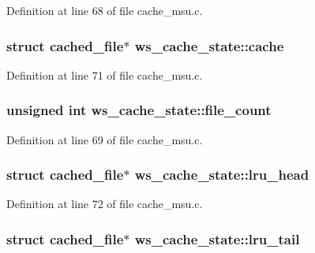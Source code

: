 Definition at line 68 of file cache\-\_\-msu.\-c.

\hypertarget{structws__cache__state_a3094652811095146a2dd8ccc48f62808}{
\subsubsection[{cache}]{\setlength{\rightskip}{0pt plus 5cm}struct {\bf cached\-\_\-file}$\ast$ ws\-\_\-cache\-\_\-state\-::cache}}\label{structws__cache__state_a3094652811095146a2dd8ccc48f62808}


Definition at line 71 of file cache\-\_\-msu.\-c.

\hypertarget{structws__cache__state_a35cf1432ae608a85c2179ad1c1cf2e19}{
\subsubsection[{file\-\_\-count}]{\setlength{\rightskip}{0pt plus 5cm}unsigned int ws\-\_\-cache\-\_\-state\-::file\-\_\-count}}\label{structws__cache__state_a35cf1432ae608a85c2179ad1c1cf2e19}


Definition at line 69 of file cache\-\_\-msu.\-c.

\hypertarget{structws__cache__state_a44d8697d1655ab25a5d2d17866ccd2d4}{
\subsubsection[{lru\-\_\-head}]{\setlength{\rightskip}{0pt plus 5cm}struct {\bf cached\-\_\-file}$\ast$ ws\-\_\-cache\-\_\-state\-::lru\-\_\-head}}\label{structws__cache__state_a44d8697d1655ab25a5d2d17866ccd2d4}


Definition at line 72 of file cache\-\_\-msu.\-c.

\hypertarget{structws__cache__state_ab9d3f866382aa71681a0ff37b34ee442}{
\subsubsection[{lru\-\_\-tail}]{\setlength{\rightskip}{0pt plus 5cm}struct {\bf cached\-\_\-file}$\ast$ ws\-\_\-cache\-\_\-state\-::lru\-\_\-tail}}\label{structws__cache__state_ab9d3f866382aa71681a0ff37b34ee442}


